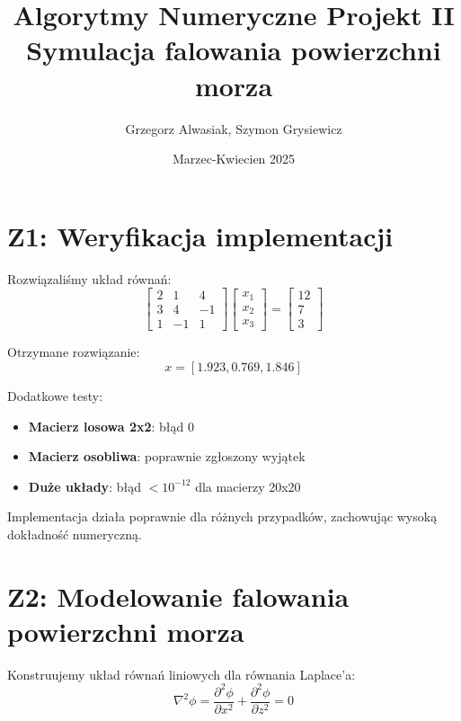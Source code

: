 \documentclass[12pt,a4paper]{article}
\title{Algorytmy Numeryczne Projekt II\\
\large{Symulacja falowania powierzchni morza}}
\author{Grzegorz Alwasiak, Szymon Grysiewicz}
\date{Marzec-Kwiecien 2025}
\begin{document}
\maketitle

\section{Z1: Weryfikacja implementacji}
Rozwiązaliśmy układ równań:
\begin{equation}
\begin{bmatrix}
2 & 1 & 4 \\
3 & 4 & -1 \\
1 & -1 & 1
\end{bmatrix}
\begin{bmatrix}
x_1 \\
x_2 \\
x_3
\end{bmatrix} =
\begin{bmatrix}
12 \\
7 \\
3
\end{bmatrix}
\end{equation}

Otrzymane rozwiązanie: 
\begin{equation}
x = [1.923, 0.769, 1.846]
\end{equation}

Dodatkowe testy:
\begin{itemize}
\item \textbf{Macierz losowa 2x2}: błąd 0
\item \textbf{Macierz osobliwa}: poprawnie zgłoszony wyjątek
\item \textbf{Duże układy}: błąd $<10^{-12}$ dla macierzy 20x20
\end{itemize}

Implementacja działa poprawnie dla różnych przypadków, zachowując wysoką dokładność numeryczną.

\section{Z2: Modelowanie falowania powierzchni morza}

\vspace{0.3cm}
Konstruujemy układ równań liniowych dla równania Laplace'a:
\begin{equation}
\nabla^2\phi = \frac{\partial^2\phi}{\partial x^2} + \frac{\partial^2\phi}{\partial z^2} = 0
\end{equation}
\end{document}
